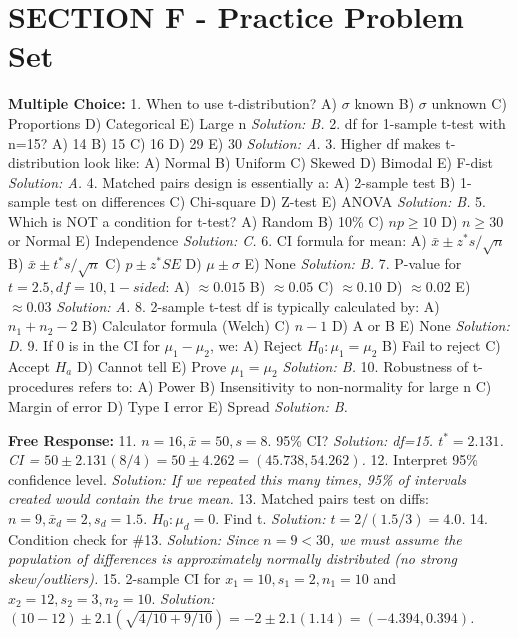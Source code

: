 \section{SECTION F - Practice Problem Set}
\begin{workbookbox}
\textbf{Multiple Choice:}
1. When to use t-distribution? A) $\sigma$ known B) $\sigma$ unknown C) Proportions D) Categorical E) Large n
\textit{Solution: B.}
2. df for 1-sample t-test with n=15? A) 14 B) 15 C) 16 D) 29 E) 30
\textit{Solution: A.}
3. Higher df makes t-distribution look like: A) Normal B) Uniform C) Skewed D) Bimodal E) F-dist
\textit{Solution: A.}
4. Matched pairs design is essentially a: A) 2-sample test B) 1-sample test on differences C) Chi-square D) Z-test E) ANOVA
\textit{Solution: B.}
5. Which is NOT a condition for t-test? A) Random B) 10\% C) $np \geq 10$ D) $n \geq 30$ or Normal E) Independence
\textit{Solution: C.}
6. CI formula for mean: A) $\bar{x} \pm z^* s/\sqrt{n}$ B) $\bar{x} \pm t^* s/\sqrt{n}$ C) $p \pm z^* SE$ D) $\mu \pm \sigma$ E) None
\textit{Solution: B.}
7. P-value for $t=2.5, df=10, 1-sided$: A) $\approx 0.015$ B) $\approx 0.05$ C) $\approx 0.10$ D) $\approx 0.02$ E) $\approx 0.03$
\textit{Solution: A.}
8. 2-sample t-test df is typically calculated by: A) $n_1+n_2-2$ B) Calculator formula (Welch) C) $n-1$ D) A or B E) None
\textit{Solution: D.}
9. If 0 is in the CI for $\mu_1 - \mu_2$, we: A) Reject $H_0: \mu_1 = \mu_2$ B) Fail to reject C) Accept $H_a$ D) Cannot tell E) Prove $\mu_1 = \mu_2$
\textit{Solution: B.}
10. Robustness of t-procedures refers to: A) Power B) Insensitivity to non-normality for large n C) Margin of error D) Type I error E) Spread
\textit{Solution: B.}

\textbf{Free Response:}
11. $n=16, \bar{x}=50, s=8$. 95\% CI?
\textit{Solution: df=15. $t^*=2.131$. CI = $50 \pm 2.131(8/4) = 50 \pm 4.262 = (45.738, 54.262)$.}
12. Interpret 95\% confidence level.
\textit{Solution: If we repeated this many times, 95\% of intervals created would contain the true mean.}
13. Matched pairs test on diffs: $n=9, \bar{x}_d = 2, s_d = 1.5$. $H_0: \mu_d=0$. Find t.
\textit{Solution: $t = 2 / (1.5/3) = 4.0$.}
14. Condition check for \#13.
\textit{Solution: Since $n=9<30$, we must assume the population of differences is approximately normally distributed (no strong skew/outliers).}
15. 2-sample CI for $x_1=10, s_1=2, n_1=10$ and $x_2=12, s_2=3, n_2=10$.
\textit{Solution: $(10-12) \pm 2.1( \sqrt{4/10 + 9/10} ) = -2 \pm 2.1(1.14) = (-4.394, 0.394)$.}
\end{workbookbox}

